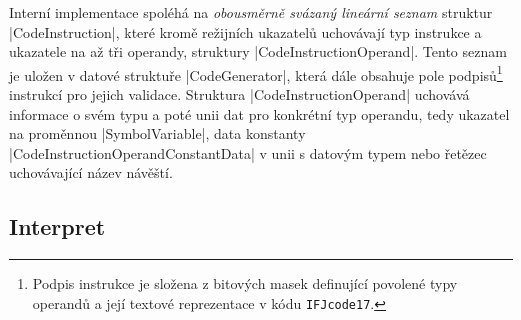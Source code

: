 Interní implementace spoléhá na \emph{obousměrně svázaný lineární seznam} struktur \ic|CodeInstruction|, které kromě režijních ukazatelů uchovávají typ instrukce a ukazatele na až tři operandy, struktury \ic|CodeInstructionOperand|. Tento seznam je uložen v datové struktuře \ic|CodeGenerator|, která dále obsahuje pole podpisů\footnote{Podpis instrukce je složena z bitových masek definující povolené typy operandů a její textové reprezentace v kódu \texttt{IFJcode17}.} instrukcí pro jejich validace.
Struktura \ic|CodeInstructionOperand| uchovává informace o svém typu a poté unii dat pro konkrétní typ operandu, tedy ukazatel na proměnnou \ic|SymbolVariable|, data konstanty \ic|CodeInstructionOperandConstantData| v unii s datovým typem nebo řetězec uchovávající název návěští.

\subsection{Interpret}
